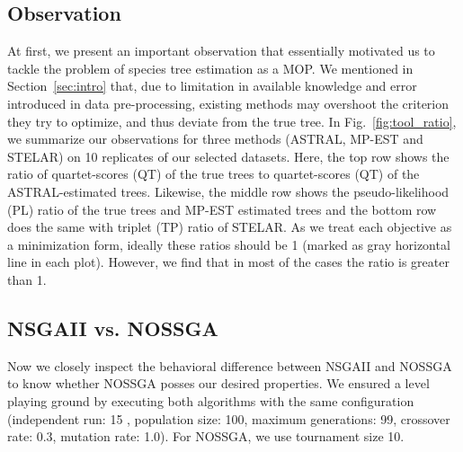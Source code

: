 \subsection{Observation}
\label{subsec:observation}
At first, we present an important observation that essentially motivated us to tackle the problem of species tree estimation as a MOP. We mentioned in Section~\ref{sec:intro} that, due to limitation in available knowledge and error introduced in data pre-processing, existing methods may overshoot the criterion they try to optimize, and thus deviate from the true tree. In Fig.~\ref{fig:tool_ratio}, we summarize our observations for three methods (ASTRAL, MP-EST and STELAR) on 10 replicates of our selected datasets. Here, the top row shows the ratio of quartet-scores (QT) of the true trees to quartet-scores (QT) of the ASTRAL-estimated trees. Likewise, the middle row shows the pseudo-likelihood (PL) ratio of the true trees and MP-EST estimated trees and the bottom row does the same with triplet (TP) ratio of STELAR. As we treat each objective as a minimization form, ideally these ratios should be 1 (marked as gray horizontal line in each plot). However, we find that in most of the cases the ratio is greater than 1. %


\subsection{NSGAII vs. NOSSGA}
Now we closely inspect the behavioral difference between NSGAII and NOSSGA to know whether NOSSGA posses our desired properties. We ensured a level playing ground by executing both algorithms with the same configuration (independent run: 15 , population size: 100, maximum generations: 99, crossover rate: 0.3, mutation rate: 1.0). For NOSSGA, we use tournament size 10.

